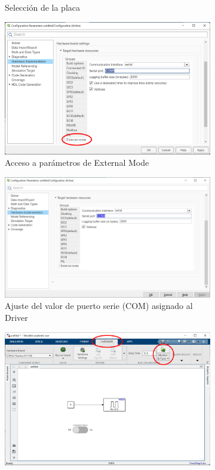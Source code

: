 \documentclass[10pt,a4paper]{report}
\begin{document}
\begin{figure}
\begin{subfigure}{0.5\textwidth}
\caption{Selección de la placa}\label{f17c}
\end{subfigure}
\begin{subfigure}{0.5\textwidth}
\centering
\includegraphics[width = \linewidth]{settings3.png}
\caption{Acceso a parámetros de External Mode}\label{f17d}
\end{subfigure}
\begin{subfigure}{0.5\textwidth}
\centering
\includegraphics[width = \linewidth]{eje6.jpg}
\caption{Ajuste del valor de puerto serie (COM) asignado al Driver}\label{f17e}
\end{subfigure}
\begin{subfigure}{0.5\textwidth}
\centering
\includegraphics[width = \linewidth]{settings4.png}

\end{subfigure}
\end{figure}
\end{document}
